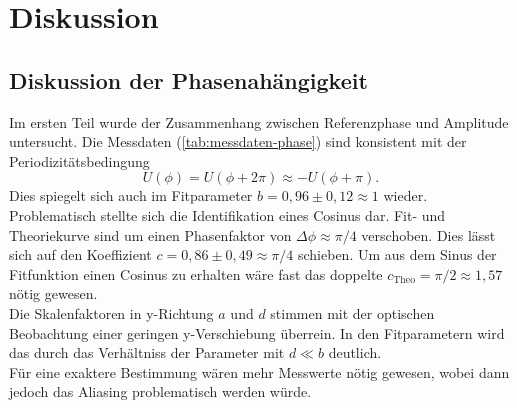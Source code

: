 \section{Diskussion}
\label{sec:Diskussion}

\subsection{Diskussion der Phasenahängigkeit}
\label{sec:Diskussion der Phasenahängigkeit}
Im ersten Teil wurde der Zusammenhang zwischen Referenzphase und Amplitude untersucht. Die
Messdaten (\autoref{tab:messdaten-phase}) sind konsistent mit der Periodizitätsbedingung
\begin{equation}
	U(\phi) = U(\phi + 2\pi) \approx -U(\phi + \pi).
\end{equation}
Dies spiegelt sich auch im Fitparameter $b = 0,96\pm0,12 \approx 1$ wieder. Problematisch
stellte sich die Identifikation eines Cosinus dar. Fit- und Theoriekurve sind um einen
Phasenfaktor von $\Delta \phi \approx \pi/4$ verschoben. Dies lässt sich auf den
Koeffizient $c = 0,86 \pm 0,49 \approx \pi / 4$ schieben. Um aus dem Sinus der
Fitfunktion einen Cosinus zu erhalten wäre fast das doppelte $c_\text{Theo} = \pi/2 \approx
1,57$ nötig gewesen.
\\
Die Skalenfaktoren in y-Richtung $a$ und $d$ stimmen mit der optischen Beobachtung einer
geringen y-Verschiebung überrein. In den Fitparametern wird das durch das
Verhältniss der Parameter mit $d \ll b$ deutlich.
\\
Für eine exaktere Bestimmung wären mehr Messwerte nötig gewesen, wobei dann jedoch das
Aliasing problematisch werden würde.

